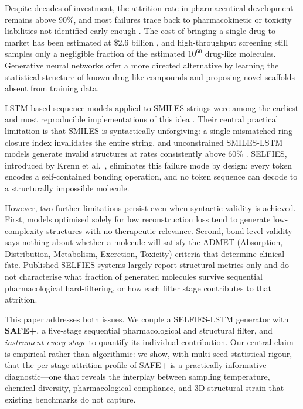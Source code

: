 \documentclass[conference]{IEEEtran}
\begin{document}
Despite decades of investment, the attrition rate in pharmaceutical development remains above 90\%, and most failures trace back to pharmacokinetic or toxicity liabilities not identified early enough \cite{ref1, ref2}. The cost of bringing a single drug to market has been estimated at \$2.6 billion \cite{ref17}, and high-throughput screening still samples only a negligible fraction of the estimated $10^{60}$ drug-like molecules. Generative neural networks offer a more directed alternative by learning the statistical structure of known drug-like compounds and proposing novel scaffolds absent from training data.

LSTM-based sequence models applied to SMILES strings were among the earliest and most reproducible implementations of this idea \cite{ref3, ref4}. Their central practical limitation is that SMILES is syntactically unforgiving: a single mismatched ring-closure index invalidates the entire string, and unconstrained SMILES-LSTM models generate invalid structures at rates consistently above 60\% \cite{ref5, ref8}. SELFIES, introduced by Krenn et al.\ \cite{ref9}, eliminates this failure mode by design: every token encodes a self-contained bonding operation, and no token sequence can decode to a structurally impossible molecule.

However, two further limitations persist even when syntactic validity is achieved. First, models optimised solely for low reconstruction loss tend to generate low-complexity structures with no therapeutic relevance. Second, bond-level validity says nothing about whether a molecule will satisfy the ADMET (Absorption, Distribution, Metabolism, Excretion, Toxicity) criteria that determine clinical fate. Published SELFIES systems largely report structural metrics only \cite{ref12, ref13} and do not characterise what fraction of generated molecules survive sequential pharmacological hard-filtering, or how each filter stage contributes to that attrition.

This paper addresses both issues. We couple a SELFIES-LSTM generator with \textbf{SAFE+}, a five-stage sequential pharmacological and structural filter, and \textit{instrument every stage} to quantify its individual contribution. Our central claim is empirical rather than algorithmic: we show, with multi-seed statistical rigour, that the per-stage attrition profile of SAFE+ is a practically informative diagnostic---one that reveals the interplay between sampling temperature, chemical diversity, pharmacological compliance, and 3D structural strain that existing benchmarks do not capture.
\end{document}
